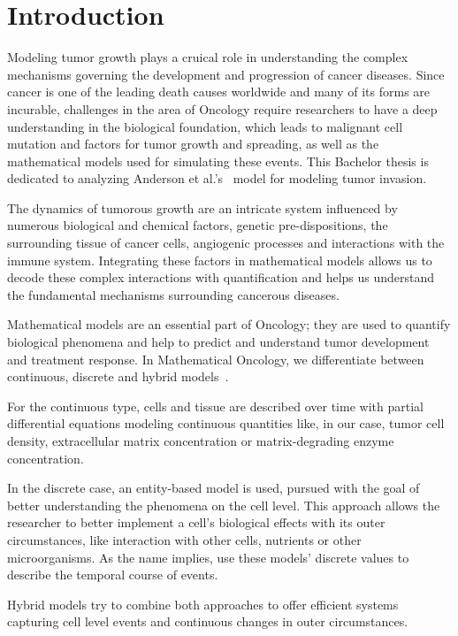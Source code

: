 \section{Introduction}
Modeling tumor growth plays a cruical role in understanding the complex mechanisms governing the development and progression of cancer diseases. Since cancer is one of the leading death causes worldwide and many of its forms are incurable, challenges in the area of Oncology require researchers to have a deep understanding in the biological foundation, which leads to malignant cell mutation and factors for tumor growth and spreading, as well as the mathematical models used for simulating these events. This Bachelor thesis is dedicated to analyzing Anderson et al.'s~\cite{anderson_continuous_1998,anderson_mathematical_2000} model for modeling tumor invasion.

The dynamics of tumorous growth are an intricate system influenced by numerous biological and chemical factors, genetic pre-dispositions, the surrounding tissue of cancer cells, angiogenic processes and interactions with the immune system. Integrating these factors in mathematical models allows us to decode these complex interactions with quantification and helps us understand the fundamental mechanisms surrounding cancerous diseases.

Mathematical models are an essential part of Oncology; they are used to quantify biological phenomena and help to predict and understand tumor development and treatment response. In Mathematical Oncology, we differentiate between continuous, discrete and hybrid models~\cite{BEKISZ2020101198}. 

For the continuous type, cells and tissue are described over time with partial differential equations modeling continuous quantities like, in our case, tumor cell density, extracellular matrix concentration or matrix-degrading enzyme concentration.

In the discrete case, an entity-based model is used, pursued with the goal of better understanding the phenomena on the cell level. This approach allows the researcher to better implement a cell's biological effects with its outer circumstances, like interaction with other cells, nutrients or other microorganisms. As the name implies, use these models' discrete values to describe the temporal course of events.

Hybrid models try to combine both approaches to offer efficient systems capturing cell level events and continuous changes in outer circumstances.

